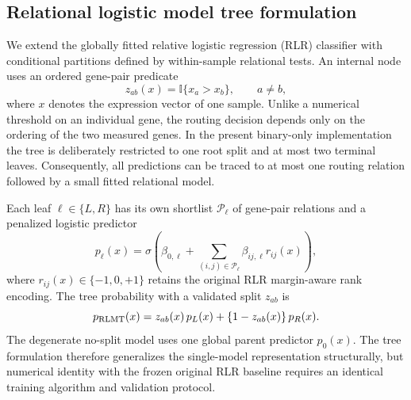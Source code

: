 %
%

\subsection{Relational logistic model tree formulation}
\label{sec:rlmt_method}

We extend the globally fitted relative logistic regression (RLR)
classifier with conditional partitions defined by within-sample
relational tests.  An internal node uses an ordered gene-pair
predicate
\begin{equation}
  z_{ab}(x)=\mathbb{I}\{x_a>x_b\},
  \qquad a\neq b ,
  \label{eq:rlmt_route}
\end{equation}
where $x$ denotes the expression vector of one sample. Unlike
a numerical threshold on an individual gene, the routing decision
depends only on the ordering of the two measured genes.  In the
present binary-only implementation the tree is deliberately
restricted to one root split and at most two terminal leaves.
Consequently, all predictions can be traced to at most one
routing relation followed by a small fitted relational model.

Each leaf $\ell\in\{L,R\}$ has its own shortlist
$\mathcal P_{\ell}$ of gene-pair relations and a penalized
logistic predictor
\begin{equation}
  p_\ell(x)=\sigma\left(
    \beta_{0,\ell}+
    \sum_{(i,j)\in\mathcal P_\ell}
      \beta_{ij,\ell}r_{ij}(x)\right),
  \label{eq:rlmt_leaf}
\end{equation}
where $r_{ij}(x)\in\{-1,0,+1\}$ retains the original RLR
margin-aware rank encoding.  The tree probability with a
validated split $z_{ab}$ is
\begin{equation}
  p_{\rm RLMT}(x)=
  z_{ab}(x)\,p_L(x)
  +\{1-z_{ab}(x)\}\,p_R(x).
  \label{eq:rlmt_predict}
\end{equation}
The degenerate no-split model uses one global parent predictor
$p_0(x)$. The tree formulation therefore generalizes the
single-model representation structurally, but numerical identity
with the frozen original RLR baseline requires an identical
training algorithm and validation protocol.

